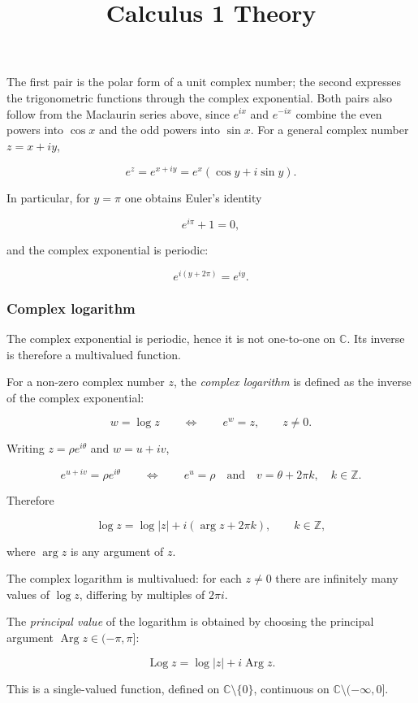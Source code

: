 \documentclass[11pt,a4paper]{article} \usepackage[T1]{fontenc}
\theoremstyle{plain} \newtheorem{theorem}{Theorem} \title{Calculus 1 Theory}
\begin{document}
The first pair is the polar form of a unit complex number; the second expresses
the trigonometric functions through the complex exponential. Both pairs also
follow from the Maclaurin series above, since $e^{ix}$ and $e^{-ix}$ combine
the even powers into $\cos x$ and the odd powers into $\sin x$. For a general
complex number $z = x + iy$,

\[
e^z = e^{x+iy} = e^x (\cos y + i\sin y).
\]

In particular, for $y = \pi$ one obtains Euler's identity

\[
e^{i\pi} + 1 = 0,
\]

and the complex exponential is periodic:

\[
e^{i(y + 2\pi)} = e^{iy}.
\]

\subsubsection {Complex logarithm}

The complex exponential is periodic, hence it is not one-to-one on
$\mathbb{C}$. Its inverse is therefore a multivalued function.

\begin{definition}
 For a non-zero complex number $z$, the \emph{complex
logarithm} is defined as the inverse of the complex exponential:

\[
w = \log z \qquad \Longleftrightarrow \qquad e^w = z, \qquad z\neq 0.
\]

Writing $z = \rho e^{i\theta}$ and $w = u + iv$,

\[
e^{u+iv} = \rho e^{i\theta} \qquad\Longleftrightarrow\qquad e^u = \rho \quad\text{and}\quad v = \theta + 2\pi k,\quad k\in\mathbb{Z}.
\]

Therefore

\[
\log z = \log |z| + i(\arg z + 2\pi k), \qquad k\in\mathbb{Z},
\]

where $\arg z$ is any argument of $z$.
\end{definition}

The complex logarithm is multivalued: for each $z\neq 0$ there are infinitely
many values of $\log z$, differing by multiples of $2\pi i$.

\begin{definition}
 The \emph{principal value} of the logarithm
is obtained by choosing the principal argument $\operatorname{Arg}
z\in(-\pi,\pi]$:

\[
\operatorname{Log} z = \log |z| + i\operatorname{Arg} z.
\]

This is a single-valued function, defined on $\mathbb{C}\setminus\{0\}$,
continuous on $\mathbb{C}\setminus(-\infty,0]$.
\end{definition}
\end{document}
